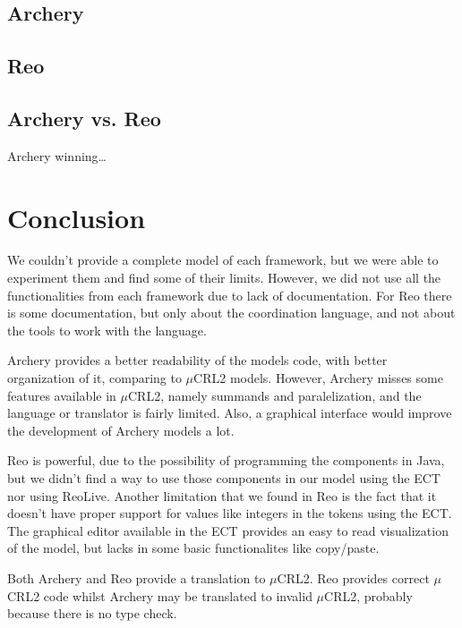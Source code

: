 \documentclass[a4paper]{article}
\newcommand{\ar}{Archery\xspace}
\newcommand{\re}{Reo\xspace}
\newcommand{\mcrl}{$\mu$CRL2\xspace}
\begin{document}
\subsection{\ar}


\subsection{\re}


\subsection{\ar vs. \re}

\ar winning\dots

%
%
\section{Conclusion}
We couldn't provide a complete model of each framework, but we were able to
experiment them and find some of their limits. However, we did not use all the
functionalities from each framework due to lack of documentation. For \re there
is some documentation, but only about the coordination language, and not about
the tools to work with the language.

\ar provides a better readability of the models code, with better organization
of it, comparing to \mcrl models. However, \ar misses some features available
in \mcrl, namely summands and paralelization, and the language or translator is
fairly limited. Also, a graphical interface would improve the development of
\ar models a lot.

\re is powerful, due to the possibility of programming the components in Java,
but we didn't find a way to use those components in our model using the ECT nor
using ReoLive. Another limitation that we found in \re is the fact that it
doesn't have proper support for values like integers in the tokens using the
ECT. The graphical editor available in the ECT provides an easy to read
visualization of the model, but lacks in some basic functionalites like
copy/paste.

Both \ar and \re provide a translation to \mcrl. \re provides correct \mcrl
code whilst \ar may be translated to invalid \mcrl, probably because there is
no type check.

\end{document}
